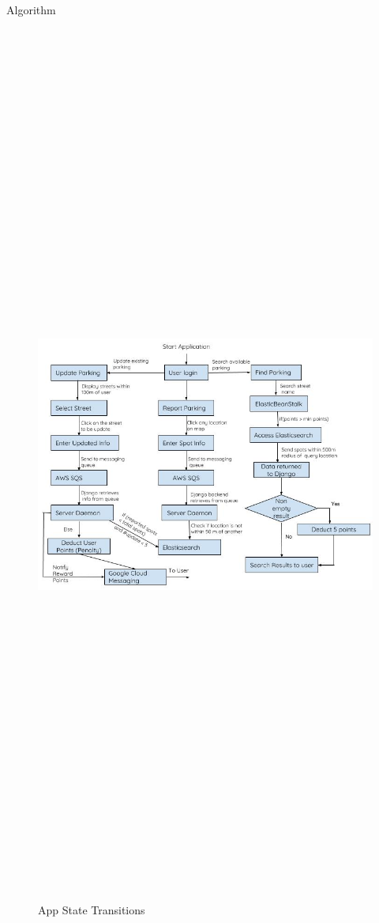 \documentclass[final]{beamer}
\newlength{\twocolwid}
\begin{document}
\begin{frame}[t]
\begin{columns}[t]
\begin{column}{\twocolwid}
\begin{block}{Algorithm}
\begin{figure}
\includegraphics[width=54cm,height=40cm]{algorithm.jpg}
\caption{App State Transitions}
\end{figure}
\end{block}


\end{column}
\end{columns}
\end{frame}
\end{document}
